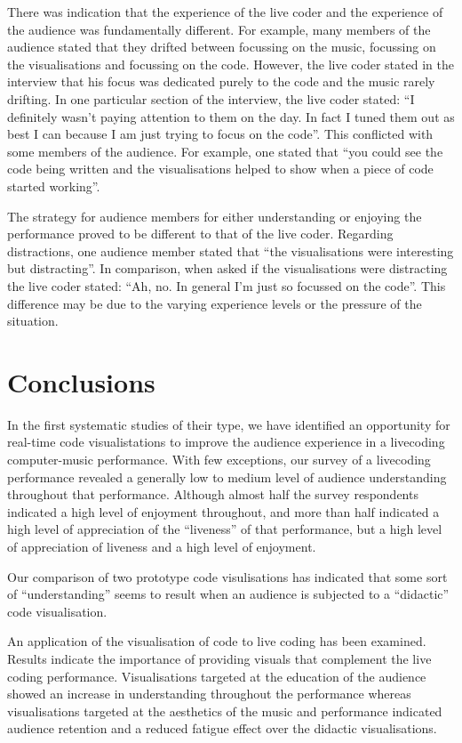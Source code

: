 \documentclass{sig-alternate}
\begin{document}
There was indication that the experience of the live coder and the experience of the audience was fundamentally different. For example, many members of the audience stated that they drifted between focussing on the music, focussing on the visualisations and focussing on the code. However, the live coder stated in the interview that his focus was dedicated purely to the code and the music rarely drifting. In one particular section of the interview, the live coder stated: ``I definitely wasn't paying attention to them on the day. In fact I tuned them out as best I can because I am just trying to focus on the code''. This conflicted with some members of the audience. For example, one stated that ``you could see the code being written and the visualisations helped to show when a piece of code started working''. 

The strategy for audience members for either understanding or enjoying the performance proved to be different to that of the live coder. Regarding distractions, one audience member stated that ``the visualisations were interesting but distracting''. In comparison, when asked if the visualisations were distracting the live coder stated: ``Ah, no. In general I'm just so focussed on the code''. This difference may be due to the varying experience levels or the pressure of the situation.

\section{Conclusions}
In the first systematic studies of their type, we have identified an opportunity for real-time code visualistations to improve the audience experience in a livecoding computer-music performance. With few exceptions, our survey of a livecoding performance revealed a generally low to medium level of audience understanding throughout that performance. Although almost half the survey respondents indicated a high level of enjoyment throughout, and more than half indicated a high level of appreciation of the ``liveness'' of that performance, but a high level of appreciation of liveness and a high level of enjoyment. 

Our comparison of two prototype code visulisations has indicated that some sort of ``understanding'' seems to result when an audience is subjected to a ``didactic'' code visualisation. 

An application of the visualisation of code to live coding has been examined. Results indicate the importance of providing visuals that complement the live coding performance. Visualisations targeted at the education of the audience showed an increase in understanding throughout the performance whereas visualisations targeted at the aesthetics of the music and performance indicated audience retention and a reduced fatigue effect over the didactic visualisations.
\end{document}

